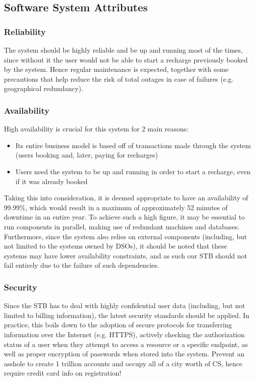 \documentclass[11pt]{article}
\begin{document}

\subsection{Software System Attributes}
\subsubsection{Reliability}
The system should be highly reliable and be up and running most of the times, since without it the user would not be able to start a recharge previously booked by the system. Hence regular maintenance is expected, together with some precautions that help reduce the risk of total outages in case of failures (e.g. geographical redundancy).

\subsubsection{Availability}
High availability is crucial for this system for 2 main reasons:
\begin{itemize}
    \item Its entire business model is based off of transactions made through the system (users booking and, later, paying for recharges)
    \item Users need the system to be up and running in order to start a recharge, even if it was already booked
\end{itemize}
Taking this into consideration, it is deemed appropriate to have an availability of 99.99\%, which would result in a maximum of approximately 52 minutes of downtime in an entire year. To achieve such a high figure, it may be essential to run components in parallel, making use of redundant machines and databases. \\
Furthermore, since the system also relies on external components (including, but not limited to the systems owned by DSOs), it should be noted that these systems may have lower availability constraints, and as such our STB should not fail entirely due to the failure of such dependencies.

\subsubsection{Security}
Since the STB has to deal with highly confidential user data (including, but not limited to billing information), the latest security standards should be applied. In practice, this boils down to the adoption of secure protocols for transferring information over the Internet (e.g. HTTPS), actively checking the authorization status of a user when they attempt to access a resource or a specific endpoint, as well as proper encryption of passwords when stored into the system.
Prevent an asshole to create 1 trillion accounts and occupy all of a city worth of CS, hence require credit card info on registration!
\end{document}
